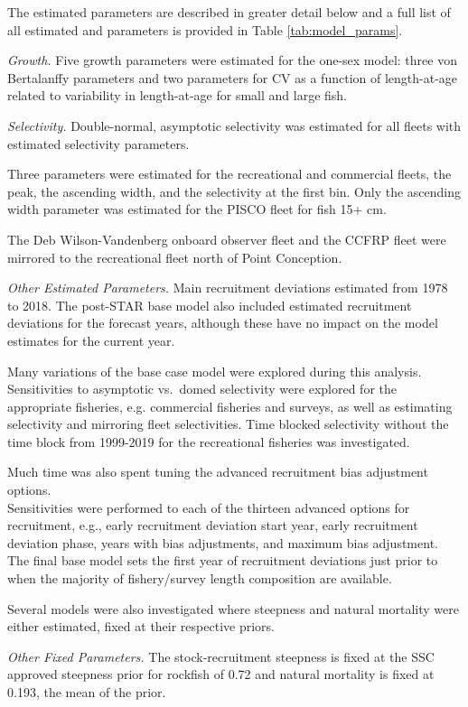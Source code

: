 \documentclass[12pt,]{article}
\begin{document}
The estimated parameters are described in greater detail below and a
full list of all estimated and parameters is provided in Table
\ref{tab:model_params}.

\emph{Growth.} Five growth parameters were estimated for the one-sex
model: three von Bertalanffy parameters and two parameters for CV as a
function of length-at-age related to variability in length-at-age for
small and large fish.

\emph{Selectivity.} Double-normal, asymptotic selectivity was estimated
for all fleets with estimated selectivity parameters.

Three parameters were estimated for the recreational and commercial
fleets, the peak, the ascending width, and the selectivity at the first
bin. Only the ascending width parameter was estimated for the PISCO
fleet for fish 15+ cm.

The Deb Wilson-Vandenberg onboard observer fleet and the CCFRP fleet
were mirrored to the recreational fleet north of Point Conception.

\emph{Other Estimated Parameters.} Main recruitment deviations estimated
from 1978 to 2018. The post-STAR base model also included estimated
recruitment deviations for the forecast years, although these have no
impact on the model estimates for the current year.

Many variations of the base case model were explored during this
analysis. Sensitivities to asymptotic vs.~domed selectivity were
explored for the appropriate fisheries, e.g. commercial fisheries and
surveys, as well as estimating selectivity and mirroring fleet
selectivities. Time blocked selectivity without the time block from
1999-2019 for the recreational fisheries was investigated.

Much time was also spent tuning the advanced recruitment bias adjustment
options.\\
Sensitivities were performed to each of the thirteen advanced options
for recruitment, e.g., early recruitment deviation start year, early
recruitment deviation phase, years with bias adjustments, and maximum
bias adjustment. The final base model sets the first year of recruitment
deviations just prior to when the majority of fishery/survey length
composition are available.

Several models were also investigated where steepness and natural
mortality were either estimated, fixed at their respective priors.

\emph{Other Fixed Parameters.} The stock-recruitment steepness is fixed
at the SSC approved steepness prior for rockfish of 0.72 and natural
mortality is fixed at 0.193, the mean of the prior.
\end{document}
